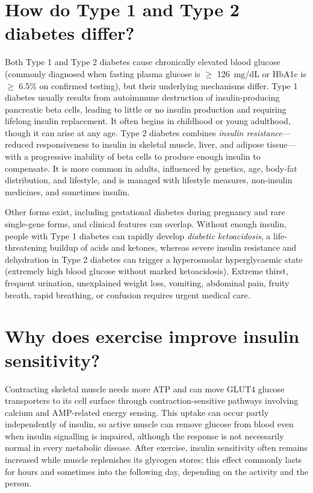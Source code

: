 \documentclass[11pt,oneside]{report}
\begin{document}
\section{How do Type 1 and Type 2 diabetes differ?}

Both Type 1 and Type 2 diabetes cause chronically elevated blood glucose (commonly
diagnosed when fasting plasma glucose is $\ge$ 126~mg/dL or HbA1c is $\ge$
6.5\% on confirmed testing), but their underlying mechanisms differ. Type 1 diabetes usually results from
autoimmune destruction of insulin-producing pancreatic beta cells, leading to
little or no insulin production and requiring lifelong insulin replacement. It
often begins in childhood or young adulthood, though it can arise at any age.
Type 2 diabetes combines \emph{insulin resistance}---reduced responsiveness to
insulin in skeletal muscle, liver, and adipose tissue---with a progressive
inability of beta cells to produce enough insulin to compensate. It is more
common in adults, influenced by genetics, age, body-fat distribution, and
lifestyle, and is managed with lifestyle measures, non-insulin medicines, and
sometimes insulin.

Other forms exist, including gestational diabetes during pregnancy and rare
single-gene forms, and clinical features can overlap. Without enough insulin,
people with Type 1 diabetes can rapidly develop \emph{diabetic ketoacidosis},
a life-threatening buildup of acids and ketones, whereas severe insulin
resistance and dehydration in Type 2 diabetes can trigger a hyperosmolar
hyperglycaemic state (extremely high blood glucose without marked ketoacidosis).
Extreme thirst, frequent urination, unexplained weight loss, vomiting,
abdominal pain, fruity breath, rapid breathing, or confusion requires urgent
medical care.

\section{Why does exercise improve insulin sensitivity?}

Contracting skeletal muscle needs more ATP and can move GLUT4 glucose
transporters to its cell surface through contraction-sensitive pathways
involving calcium and AMP-related energy sensing. This uptake can occur partly
independently of insulin, so active muscle can remove glucose from blood even
when insulin signalling is impaired, although the response is not necessarily
normal in every metabolic disease. After exercise, insulin sensitivity often
remains increased while muscle replenishes its glycogen stores; this effect
commonly lasts for hours and sometimes into the following day, depending on
the activity and the person.
\end{document}
